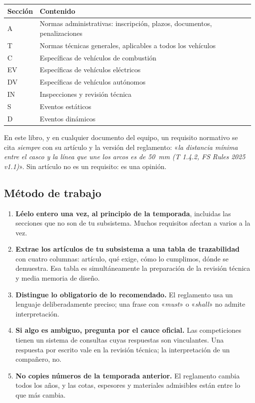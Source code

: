 \begin{center}
\begin{tabular}{@{}ll@{}}
\toprule
\textbf{Sección} & \textbf{Contenido} \\
\midrule
A  & Normas administrativas: inscripción, plazos, documentos, penalizaciones \\
T  & Normas técnicas generales, aplicables a todos los vehículos \\
C  & Específicas de vehículos de combustión \\
EV & Específicas de vehículos eléctricos \\
DV & Específicas de vehículos autónomos \\
IN & Inspecciones y revisión técnica \\
S  & Eventos estáticos \\
D  & Eventos dinámicos \\
\bottomrule
\end{tabular}
\end{center}

\begin{regla}
En este libro, y en cualquier documento del equipo, un requisito normativo se
cita \emph{siempre} con su artículo y la versión del reglamento:
«\textit{la distancia mínima entre el casco y la línea que une los arcos es de
\SI{50}{\milli\meter} (T 1.4.2, FS Rules 2025 v1.1)}». Sin artículo no es un
requisito: es una opinión.
\end{regla}

\subsection{Método de trabajo}

\begin{enumerate}
  \item \textbf{Léelo entero una vez, al principio de la temporada}, incluidas
        las secciones que no son de tu subsistema. Muchos requisitos afectan a
        varios a la vez.
  \item \textbf{Extrae los artículos de tu subsistema a una tabla de
        trazabilidad} con cuatro columnas: artículo, qué exige, cómo lo
        cumplimos, dónde se demuestra. Esa tabla es simultáneamente la
        preparación de la revisión técnica y media memoria de diseño.
  \item \textbf{Distingue lo obligatorio de lo recomendado.} El reglamento usa un
        lenguaje deliberadamente preciso; una frase con «\textit{must}» o
        «\textit{shall}» no admite interpretación.
  \item \textbf{Si algo es ambiguo, pregunta por el cauce oficial.} Las
        competiciones tienen un sistema de consultas cuyas respuestas son
        vinculantes. Una respuesta por escrito vale en la revisión técnica; la
        interpretación de un compañero, no.
  \item \textbf{No copies números de la temporada anterior.} El reglamento cambia
        todos los años, y las cotas, espesores y materiales admisibles están
        entre lo que más cambia.
\end{enumerate}

